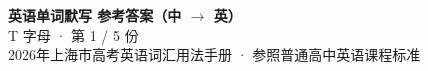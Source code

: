 \documentclass[10pt,a4paper]{article}
\begin{document}
\pagestyle{plain}

\begin{center}
{\LARGE\bfseries 英语单词默写 \quad 参考答案（中 $\to$ 英）}\\[0.22em]
{\large T 字母 · 第 1 / 5 份}\\[0.18em]
{\small 2026年上海市高考英语词汇用法手册 · 参照普通高中英语课程标准}
\end{center}

\vspace{0.2em}
\noindent{\color{rulegray}\rule{\textwidth}{0.8pt}}

\vspace{0.35em}

\vspace{0.25em}
\renewcommand{\arraystretch}{1.32}
\end{document}

